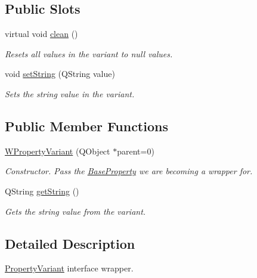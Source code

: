 \subsection*{Public Slots}
\begin{DoxyCompactItemize}
\item 
\hypertarget{class_w_property_variant_ac65a934d025edab801ff99ea994599dd}{virtual void \hyperlink{class_w_property_variant_ac65a934d025edab801ff99ea994599dd}{clean} ()}\label{class_w_property_variant_ac65a934d025edab801ff99ea994599dd}

\begin{DoxyCompactList}\small\item\em Resets all values in the variant to null values. \end{DoxyCompactList}\item 
void \hyperlink{class_w_property_variant_a6963fdf9928d8c5d29d5d16d5d413692}{set\-String} (Q\-String value)
\begin{DoxyCompactList}\small\item\em Sets the string value in the variant. \end{DoxyCompactList}\end{DoxyCompactItemize}
\subsection*{Public Member Functions}
\begin{DoxyCompactItemize}
\item 
\hyperlink{class_w_property_variant_a6f8f1388b5544955cadabf31d11ae3c2}{W\-Property\-Variant} (Q\-Object $\ast$parent=0)
\begin{DoxyCompactList}\small\item\em Constructor. Pass the \hyperlink{class_base_property}{Base\-Property} we are becoming a wrapper for. \end{DoxyCompactList}\item 
Q\-String \hyperlink{class_w_property_variant_acf9b9e6aed5edc15c92fe42eab80cf78}{get\-String} ()
\begin{DoxyCompactList}\small\item\em Gets the string value from the variant. \end{DoxyCompactList}\end{DoxyCompactItemize}


\subsection{Detailed Description}
\hyperlink{class_property_variant}{Property\-Variant} interface wrapper. 

